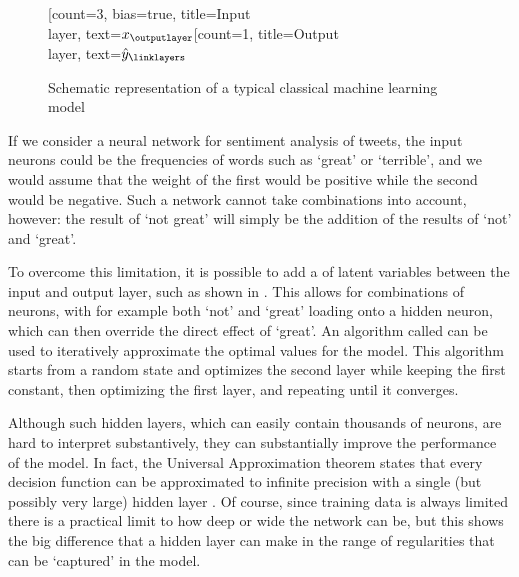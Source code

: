 \begin{figure}
  \centering
 \begin{neuralnetwork}[height=4]
        \newcommand{\x}[2]{$x_#2$}
        \newcommand{\y}[2]{$\hat{y}_#2$}
        [count=3, bias=true, title=Input\\layer, text=\x]
        \outputlayer[count=1, title=Output\\layer, text=\y] \linklayers
 \end{neuralnetwork}
\caption{Schematic representation of a typical classical machine learning model \label{fig:perceptron}}
\end{figure}

If we consider a neural network for sentiment analysis of tweets,
the input neurons could be the frequencies of words such as `great' or `terrible',
and we would assume that the weight of the first would be positive while the second would be negative.
Such a network cannot take combinations into account, however:
the result of `not great' will simply be the addition of the results of `not' and `great'.

To overcome this limitation, it is possible to add a  of latent variables
between the input and output layer, such as shown in .
This allows for combinations of neurons, with for example both `not' and `great' loading onto a hidden neuron,
which can then override the direct effect of `great'.
An algorithm called  can be used to iteratively approximate the optimal values for the model.
This algorithm starts from a random state and optimizes the second layer while keeping the first constant,
then optimizing the first layer, and repeating until it converges. 

Although such hidden layers, which can easily contain thousands of neurons, are hard to interpret substantively,
they can substantially improve the performance of the model.
In fact, the Universal Approximation theorem states that every decision function can be approximated to infinite precision
with a single (but possibly very large) hidden layer \citet{goldberg17}.
Of course, since training data is always limited there is a practical limit to how deep or wide the network can be,
but this shows the big difference that a hidden layer can make in the range of regularities that can be `captured' in the model. 


